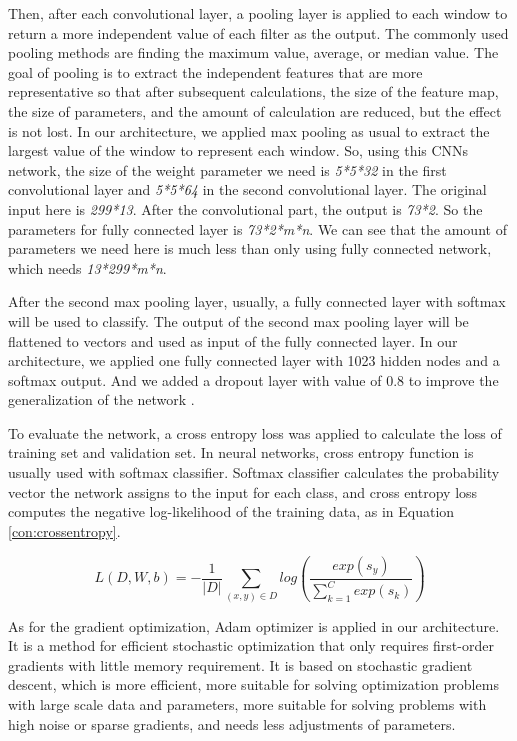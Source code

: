 \documentclass{article}
\begin{document}
Then, after each convolutional layer, a pooling layer is applied to each window to return a more independent value of each filter as the output. The commonly used pooling methods are finding the maximum value, average, or median value. The goal of pooling is to extract the independent features that are more representative so that after subsequent calculations, the size of the feature map, the size of parameters, and the amount of calculation are reduced, but the effect is not lost. In our architecture, we applied max pooling as usual to extract the largest value of the window to represent each window. So, using this CNNs network, the size of the weight parameter we need is \emph{5*5*32} in the first convolutional layer and \emph{5*5*64} in the second convolutional layer. The original input here is \emph{299*13}. After the convolutional part, the output is \emph{73*2}. So the parameters for fully connected layer is \emph{73*2*m*n}. We can see that the amount of parameters we need here is much less than only using fully connected network, which needs \emph{13*299*m*n}.

After the second max pooling layer, usually, a fully connected layer with softmax will be used to classify. The output of the second max pooling layer will be flattened to vectors and used as input of the fully connected layer. In our architecture, we applied one fully connected layer with 1023 hidden nodes and a softmax output. And we added a dropout layer with value of 0.8 to improve the generalization of the network \cite{srivastava}.

To evaluate the network, a cross entropy loss was applied to calculate the loss of training set and validation set. In neural networks, cross entropy function is usually used with softmax classifier. Softmax classifier calculates the probability vector the network assigns to the input for each class, and cross entropy loss computes the negative log-likelihood of the training data, as in Equation \ref{con:crossentropy}.

\begin{equation}
L(D, W, b)=-\frac{1}{|D|}\sum_{(x,y)\in D}log(\frac{exp(s_y)}{\sum_{k=1}^{C} exp(s_k)}) \label{con:crossentropy}  
\end{equation}

As for the gradient optimization, Adam optimizer is applied in our architecture. It is a method for efficient stochastic optimization that only requires first-order gradients with little memory requirement.\cite{adam} It is based on stochastic gradient descent, which is more efficient, more suitable for solving optimization problems with large scale data and parameters, more suitable for solving problems with high noise or sparse gradients, and needs less adjustments of parameters.
\end{document}
